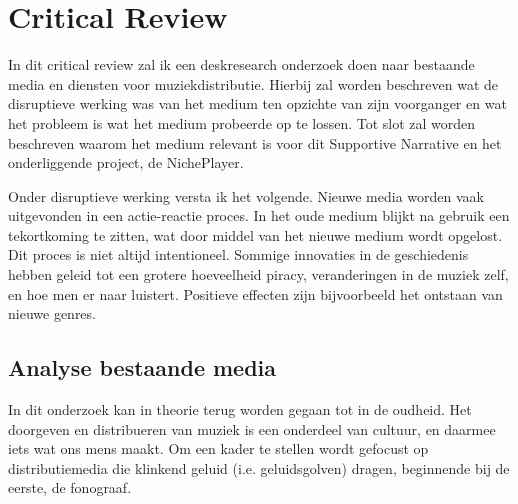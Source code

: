 \section{Critical Review}
\captionsetup[figure]{font=small,labelfont=bf}


In dit critical review zal ik een deskresearch onderzoek doen naar bestaande media en diensten voor muziekdistributie. Hierbij zal worden beschreven wat de disruptieve werking was van het medium ten opzichte van zijn voorganger en wat het probleem is wat het medium probeerde op te lossen. Tot slot zal worden beschreven waarom het medium relevant is voor dit Supportive Narrative en het onderliggende project, de NichePlayer.

Onder disruptieve werking versta ik het volgende. Nieuwe media worden vaak uitgevonden in een actie-reactie proces. In het oude medium blijkt na gebruik een tekortkoming te zitten, wat door middel van het nieuwe medium wordt opgelost. Dit proces is niet altijd intentioneel. Sommige innovaties in de geschiedenis hebben geleid tot een grotere hoeveelheid piracy, veranderingen in de muziek zelf, en hoe men er naar luistert. Positieve effecten zijn bijvoorbeeld het ontstaan van nieuwe genres.


\subsection{Analyse bestaande media}
In dit onderzoek kan in theorie terug worden gegaan tot in de oudheid. Het doorgeven en distribueren van muziek is een onderdeel van cultuur, en daarmee iets wat ons mens maakt. Om een kader te stellen wordt gefocust op distributiemedia die klinkend geluid (i.e. geluidsgolven) dragen, beginnende bij de eerste, de fonograaf.

